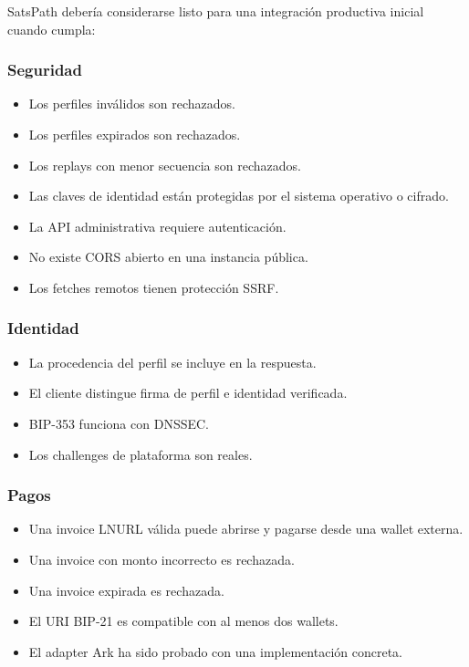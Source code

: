 \documentclass[
]{article}
\providecommand{\tightlist}{%
  \setlength{\itemsep}{0pt}\setlength{\parskip}{0pt}}
\begin{document}
SatsPath debería considerarse listo para una integración productiva
inicial cuando cumpla:

\hypertarget{seguridad}{%
\subsubsection{Seguridad}\label{seguridad}}

\begin{itemize}
\tightlist
\item[$\square$]
  Los perfiles inválidos son rechazados.
\item[$\square$]
  Los perfiles expirados son rechazados.
\item[$\square$]
  Los replays con menor secuencia son rechazados.
\item[$\square$]
  Las claves de identidad están protegidas por el sistema operativo o
  cifrado.
\item[$\square$]
  La API administrativa requiere autenticación.
\item[$\square$]
  No existe CORS abierto en una instancia pública.
\item[$\square$]
  Los fetches remotos tienen protección SSRF.
\end{itemize}

\hypertarget{identidad}{%
\subsubsection{Identidad}\label{identidad}}

\begin{itemize}
\tightlist
\item[$\square$]
  La procedencia del perfil se incluye en la respuesta.
\item[$\square$]
  El cliente distingue firma de perfil e identidad verificada.
\item[$\square$]
  BIP-353 funciona con DNSSEC.
\item[$\square$]
  Los challenges de plataforma son reales.
\end{itemize}

\hypertarget{pagos}{%
\subsubsection{Pagos}\label{pagos}}

\begin{itemize}
\tightlist
\item[$\square$]
  Una invoice LNURL válida puede abrirse y pagarse desde una wallet
  externa.
\item[$\square$]
  Una invoice con monto incorrecto es rechazada.
\item[$\square$]
  Una invoice expirada es rechazada.
\item[$\square$]
  El URI BIP-21 es compatible con al menos dos wallets.
\item[$\square$]
  El adapter Ark ha sido probado con una implementación concreta.
\end{itemize}
\end{document}
